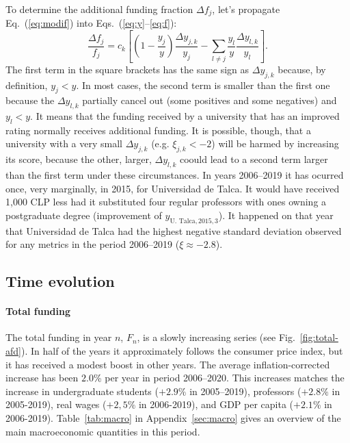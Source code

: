 \documentclass[twocolumn]{article}
\def\eqref#1{Eq.~(\ref{eq:#1})}
\def\eqsref#1#2{Eqs.~(\ref{eq:#1}--\ref{eq:#2})}
\begin{document}
To determine the additional funding fraction $\Delta f_j$, let's propagate 
\eqref{modif} into \eqsref{y}{f}:
\begin{equation}
    \frac{\Delta f_j}{f_j} = c_k \left[
                     \left(1 - \frac{y_{j}}y\right)\frac{\Delta y_{j,k}}{y_{j}}
                    - \sum_{l \ne j} \frac{y_l}y \frac{\Delta y_{l,k}}{y_l}
                 \right].
\end{equation}
The first term in the square brackets has the same sign as $\Delta y_{j,k}$ because, by definition, $y_j < y$.  In most cases, the second term is smaller than the first one because the $\Delta y_{l,k}$ partially cancel out (some positives and some negatives) and $y_l < y$. It means that the funding received by a university that has an improved rating normally receives additional funding.  It is possible, though, that a university with a very small $\Delta y_{j,k}$ (e.g. $\xi_{j,k} < -2$) will be harmed by increasing its score, because the other, larger, $\Delta y_{l,k}$ coould lead to a second term larger than the first term under these circumstances.  In years 2006--2019 it has ocurred once, very marginally, in 2015, for Universidad de Talca.  It would have received 1,000 CLP less had it substituted four regular professors with ones owning a postgraduate degree (improvement of $y_{\text{U. Talca}, 2015, 3}$).  It happened on that year that Universidad de Talca had the highest negative standard deviation observed for any metrics in the period 2006--2019 ($\xi \approx -2.8$). 

\subsection{Time evolution}
\paragraph{Total funding}
The total funding in year $n$, $F_{n}$, is a slowly increasing series (see Fig.~\ref{fig:total-afd}). In half of the years it approximately follows the consumer price index, but it has received a modest boost in other years.  The average inflation-corrected increase has been $2.0$\% per year in period 2006--2020. This increases matches the increase in undergraduate students ($+2.9\%$ in 2005--2019), professors ($+2.8\%$ in 2005-2019), real wages ($+2,5\%$ in 2006-2019), and GDP per capita ($+2.1$\% in 2006-2019). Table~\ref{tab:macro} in Appendix~\ref{sec:macro} gives an overview of the main macroeconomic quantities in this period. 
\end{document}
